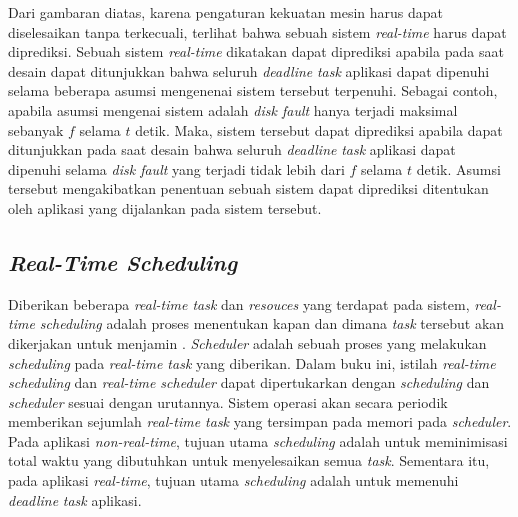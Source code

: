 Dari gambaran diatas, karena pengaturan kekuatan mesin harus dapat diselesaikan tanpa terkecuali, terlihat bahwa sebuah sistem \textit{real-time} harus dapat diprediksi.
Sebuah sistem \textit{real-time} dikatakan dapat diprediksi apabila pada saat desain dapat ditunjukkan bahwa seluruh \textit{deadline} \textit{task} aplikasi dapat dipenuhi selama beberapa asumsi mengenenai sistem tersebut terpenuhi.
Sebagai contoh, apabila asumsi mengenai sistem adalah \textit{disk fault} hanya terjadi maksimal sebanyak $f$ selama $t$ detik.
Maka, sistem tersebut dapat diprediksi apabila dapat ditunjukkan pada saat desain bahwa seluruh \textit{deadline} \textit{task} aplikasi dapat dipenuhi selama \textit{disk fault} yang terjadi tidak lebih dari $f$ selama $t$ detik.
Asumsi tersebut mengakibatkan penentuan sebuah sistem dapat diprediksi ditentukan oleh aplikasi yang dijalankan pada sistem tersebut.

\subsection{\textit{Real-Time Scheduling}}

Diberikan beberapa \textit{real-time task} dan \textit{resouces} yang terdapat pada sistem, \textit{real-time scheduling} adalah proses menentukan kapan dan dimana \textit{task} tersebut akan dikerjakan untuk menjamin \cite[pp.~8-9]{Shin1994}.
\textit{Scheduler} adalah sebuah proses yang melakukan \textit{scheduling} pada \textit{real-time task} yang diberikan.
Dalam buku ini, istilah \textit{real-time scheduling} dan \textit{real-time scheduler} dapat dipertukarkan dengan \textit{scheduling} dan \textit{scheduler} sesuai dengan urutannya.
Sistem operasi akan secara periodik memberikan sejumlah \textit{real-time task} yang tersimpan pada memori pada \textit{scheduler}.
Pada aplikasi \textit{non-real-time}, tujuan utama \textit{scheduling} adalah untuk meminimisasi total waktu yang dibutuhkan untuk menyelesaikan semua \textit{task}.
Sementara itu, pada aplikasi \textit{real-time}, tujuan utama \textit{scheduling} adalah untuk memenuhi \textit{deadline} \textit{task} aplikasi.

